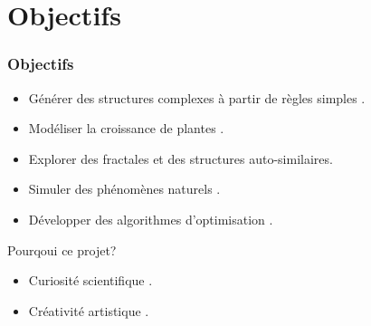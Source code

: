 \section{Objectifs} %

\begin{frame}
    \frametitle{Objectifs}
  
\begin{itemize}
    \item     Générer des structures complexes à partir de règles simples .

   \item Modéliser la croissance de plantes .

   \item  Explorer des fractales et des structures auto-similaires.

    \item Simuler des phénomènes naturels .

    \item Développer des algorithmes d'optimisation .
\end{itemize}

\end{frame}

\begin{frame}{Pourqoui ce projet?}
\begin{itemize}
    \item Curiosité scientifique .
    \item  Créativité artistique .
\end{itemize}
   



\end{frame}